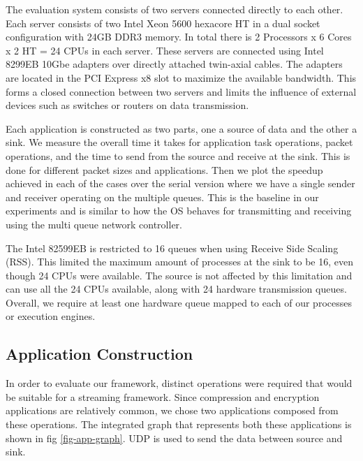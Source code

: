 \documentclass[conference]{IEEEtran}
\newcommand{\comment}[1]{}
\begin{document}
The evaluation system consists of two servers connected directly to each other. Each server consists of two Intel Xeon 5600 hexacore HT in a dual socket configuration with 24GB DDR3 memory. In total there is 2 Processors x 6 Cores x 2 HT = 24 CPUs in each server. These servers are connected using Intel 8299EB 10Gbe adapters over directly attached twin-axial cables. The adapters are located in the PCI Express x8 slot to maximize the available bandwidth. This forms a closed connection between two servers and limits the influence of external devices such as switches or routers on data transmission.

Each application is constructed as two parts, one a source of data and the other a sink. We measure the overall time it takes for application task operations, packet operations, and the time to send from the source and receive at the sink. This is done for different packet sizes and applications. Then we plot the speedup achieved in each of the cases over the serial version where we have a single sender and receiver operating on the multiple queues. This is the baseline in our experiments and is similar to how the OS behaves for transmitting and receiving using the multi queue network controller.

The Intel 82599EB is restricted to 16 queues when using Receive Side Scaling (RSS). This limited the maximum amount of processes at the sink to be 16, even though 24 CPUs were available. The source is not affected by this limitation and can use all the 24 CPUs available, along with 24 hardware transmission queues. Overall, we require at least one hardware queue mapped to each of our processes or execution engines. \comment{We also ensure that each of the processes are bound to a particular CPU by issuing affinity calls to the OS to ensure that they are not migrated between different cores.}

\subsection{Application Construction}
\label{app-const}

In order to evaluate our framework, distinct operations were required that would be suitable for a streaming framework. Since compression and encryption applications are relatively common, we chose two applications composed from these operations. The integrated graph that represents both these applications is shown in fig \ref{fig-app-graph}. UDP is used to send the data between source and sink.
\end{document}
